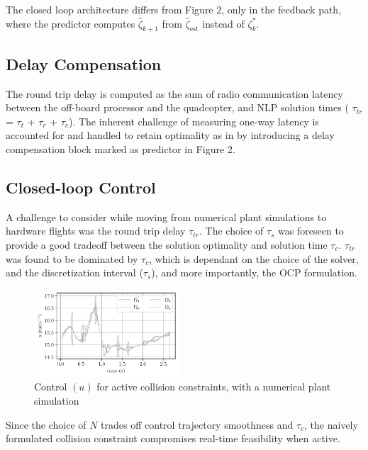 \documentclass[conference]{IEEEtran}
\begin{document}
The closed loop architecture differs from Figure 2, only in the feedback path, where the predictor computes $\hat{\zeta}_{k+1}$ from $\hat{\zeta}_{\mathrm{est}}$ instead of $\zeta^*_{k}$.

\subsection{Delay Compensation}

The round trip delay is computed as the sum of radio communication latency between the off-board processor and the quadcopter, and NLP solution times ( $\tau_{tr}$ = $\tau_{t}$ + $\tau_{r}$ + $\tau_{c}$). The inherent challenge of measuring one-way latency is accounted for and handled to retain  optimality as in \cite{carlos_efficient_2020} by introducing a delay compensation block marked as predictor in Figure 2.

\subsection{Closed-loop Control}\label{Section5}

A challenge to consider while moving from numerical plant simulations to hardware flights was the round trip delay $\tau_{tr}$. The choice of
$\tau_s$ was foreseen to provide a good tradeoff between the solution optimality and solution time $\tau_{c}$.
$\tau_{tr}$ was found to be dominated by $\tau_{c}$, which is dependant on the choice of the solver, and the discretization interval ($\tau_s$), and more importantly, the OCP formulation.

\begin{figure}[t!]
    \includegraphics[width=0.48\textwidth]{figures/u.pdf}
    \caption{Control $(u)$ for active collision constraints, with a numerical plant simulation}  \label{fig_comp_zeta_u_AGV}
\end{figure}

Since the choice of $N$ trades off control trajectory smoothness and $\tau_{c}$, the naively formulated collision constraint compromises real-time feasibility when active.
\end{document}
